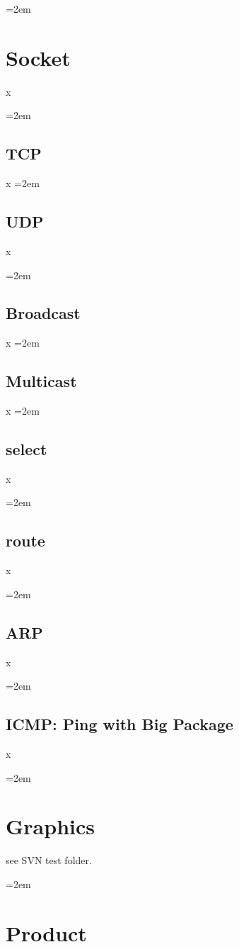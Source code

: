 \documentclass[a4paper]{article}
\let\oldsection\section
\renewcommand{\section}{\leftskip=2em \oldsection}
\let\oldsubsection\subsection
\renewcommand{\subsection}{\leftskip=2em \oldsubsection}
\begin{document}
\section{Socket}

x

\subsection{TCP}

x
\subsection{UDP}
x

\subsection{Broadcast}

x
\subsection{Multicast}

x
\subsection{select}
x

\subsection{route}
x

\subsection{ARP}
x

\subsection{ICMP: Ping with Big Package}

x

\newpage
\section{Graphics}

see SVN test folder.

\newpage
\section{Product}
\end{document}
